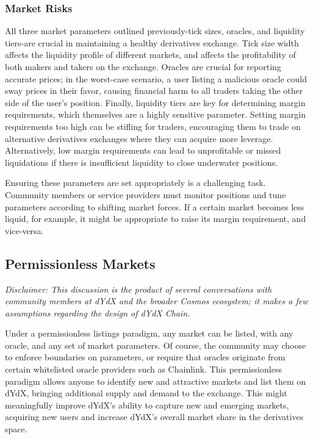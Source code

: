         \subsubsection{Market Risks}

            All three market parameters outlined previously-tick sizes, oracles, and liquidity tiers-are crucial in maintaining a healthy derivatives exchange. Tick size width affects the liquidity profile of different markets, and affects the profitability of both makers and takers on the exchange. Oracles are crucial for reporting accurate prices; in the worst-case scenario, a user listing a malicious oracle could sway prices in their favor, causing financial harm to all traders taking the other side of the user's position. Finally, liquidity tiers are key for determining margin requirements, which themselves are a highly sensitive parameter. Setting margin requirements too high can be stifling for traders, encouraging them to trade on alternative derivatives exchanges where they can acquire more leverage. Alternatively, low margin requirements can lead to unprofitable or missed liquidations if there is insufficient liquidity to close underwater positions.

            Ensuring these parameters are set appropriately is a challenging task. Community members or service providers must monitor positions and tune parameters according to shifting market forces. If a certain market becomes less liquid, for example, it might be appropriate to raise its margin requirement, and vice-versa. 

    \subsection{Permissionless Markets} \label{subsec:corepermissionless}
    
        \textit{Disclaimer: This discussion is the product of several conversations with community members at dYdX and the broader Cosmos ecosystem; it makes a few assumptions regarding the design of dYdX Chain.}

        Under a permissionless listings paradigm, any market can be listed, with any oracle, and any set of market parameters. Of course, the community may choose to enforce boundaries on parameters, or require that oracles originate from certain whitelisted oracle providers such as Chainlink. This permissionless paradigm allows anyone to identify new and attractive markets and list them on dYdX, bringing additional supply and demand to the exchange. This might meaningfully improve dYdX's ability to capture new and emerging markets, acquiring new users and increase dYdX's overall market share in the derivatives space. 
        
